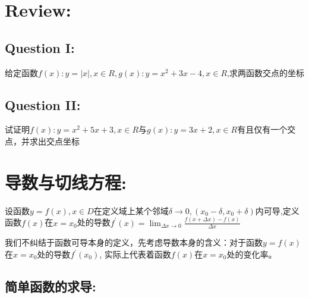 \documentclass[UTF8]{article}
\begin{document}
\section{Review:}

\subsection{Question I:}

给定函数$f(x) : y = |x|, x \in R, g(x) : y = x^2 + 3x - 4, x \in R$,求两函数交点的坐标

\subsection{Question II:}

试证明$f(x) : y = x^2 + 5x + 3, x \in R$与$g(x) : y = 3x + 2, x \in R$有且仅有一个交点，并求出交点坐标\\

\section{导数与切线方程:}

设函数$y = f(x), x\in D$在定义域上某个邻域$\delta \to 0, (x_0 - \delta, x_0 + \delta)$内可导,定义函数$f(x)$在$x = x_0$处的导数$f^{'}(x) = \lim_{\Delta x \to 0}\frac{f(x + \Delta x) - f(x)}{\Delta x}$

我们不纠结于函数可导本身的定义，先考虑导数本身的含义：对于函数$y = f(x)$在$x = x_0$处的导数$f^{'}(x_0)$, 实际上代表着函数$f(x)$在$x = x_0$处的变化率。

\subsection{简单函数的求导:}
\end{document}
